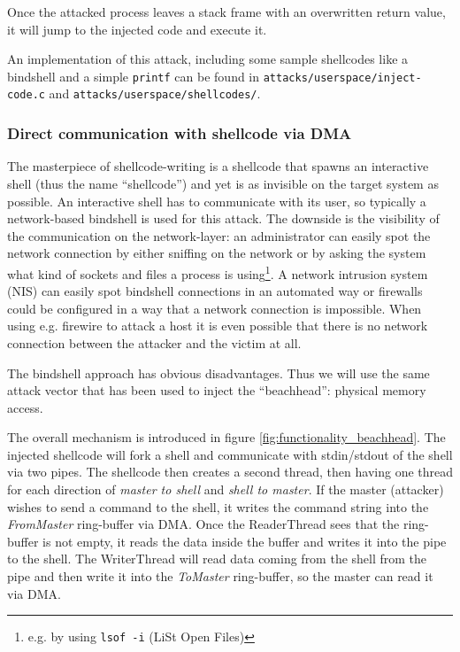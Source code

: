 Once the attacked process leaves a stack frame with an overwritten return value,
it will jump to the injected code and execute it.

An implementation of this attack, including some sample shellcodes like a
bindshell and a simple \texttt{printf} can be found in
\texttt{attacks/userspace/inject-code.c} and \linebreak
\texttt{attacks/userspace/shellcodes/}.


\subsubsection{Direct communication with shellcode via DMA}

\label{communication_DMA} The masterpiece of shellcode-writing is a shellcode
that spawns an interactive shell (thus the name ``shellcode'') and yet is as
invisible on the target system as possible.  An interactive shell has to
communicate with its user, so typically a network-based bindshell is used for
this attack. The downside is the visibility of the communication on the
network-layer: an administrator can easily spot the network connection by either
sniffing on the network or by asking the system what kind of sockets and files a
process is using\footnote{e.g. by using \texttt{lsof -i} (LiSt Open Files)}. A
network intrusion system (NIS) can easily spot bindshell connections in an
automated way or firewalls could be configured in a way that a network
connection is impossible. When using e.g. firewire to attack a host it is even
possible that there is no network connection between the attacker and the victim
at all.

The bindshell approach has obvious disadvantages. Thus we will use the same
attack vector that has been used to inject the ``beachhead'': physical memory
access.

The overall mechanism is introduced in figure \ref{fig:functionality_beachhead}.
The injected shellcode will fork a shell and communicate with stdin/stdout of
the shell via two pipes. The shellcode then creates a second thread, then having
one thread for each direction of \emph{master to shell} and \emph{shell to
master}. If the master (attacker) wishes to send a command to the shell, it
writes the command string into the \emph{FromMaster} ring-buffer via DMA.  Once
the ReaderThread sees that the ring-buffer is not empty, it reads the data
inside the buffer and writes it into the pipe to the shell.  The WriterThread
will read data coming from the shell from the pipe and then write it into the
\emph{ToMaster} ring-buffer, so the master can read it via DMA.

